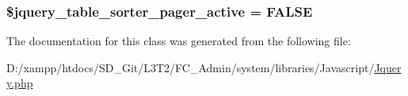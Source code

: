 \subsubsection[{\$jquery\+\_\+table\+\_\+sorter\+\_\+pager\+\_\+active}]{\setlength{\rightskip}{0pt plus 5cm}\$jquery\+\_\+table\+\_\+sorter\+\_\+pager\+\_\+active = F\+A\+L\+S\+E}\label{class_c_i___jquery_a43cc145aba3c11e907fb4245f23bc44e}


The documentation for this class was generated from the following file\+:\begin{DoxyCompactItemize}
\item 
D\+:/xampp/htdocs/\+S\+D\+\_\+\+Git/\+L3\+T2/\+F\+C\+\_\+\+Admin/system/libraries/\+Javascript/\hyperlink{_jquery_8php}{Jquery.\+php}\end{DoxyCompactItemize}
